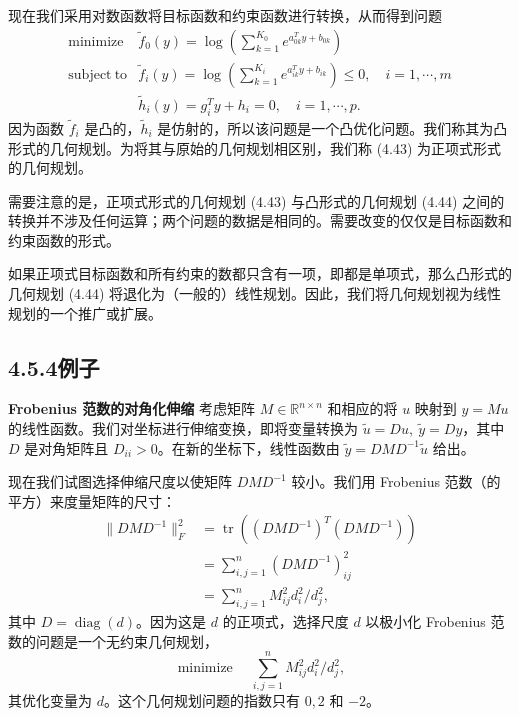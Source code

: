 \documentclass[UTF8, 12pt, fontset=fandol, oneside]{ctexart}
\begin{document}
现在我们采用对数函数将目标函数和约束函数进行转换，从而得到问题
\begin{equation}
\begin{array}{ll}
\mathop{\mathrm{minimize}} & \tilde f_0(y)=\log\left(\displaystyle\sum_{k=1}^{K_0}e^{a_{0k}^Ty+b_{0k}}\right)\\
\mathrm{subject\ to} & \tilde f_i(y)=\log\left(\displaystyle\sum_{k=1}^{K_i}e^{a_{ik}^Ty+b_{ik}}\right)\leq 0,\quad i=1,\cdots,m\\
& \tilde h_i(y)=g_i^Ty+h_i=0,\quad i=1,\cdots,p.
\end{array}
\tag{4.44}
\end{equation}
因为函数 $\tilde f_i$ 是凸的，$\tilde h_i$ 是仿射的，所以该问题是一个凸优化问题。我们称其为凸形式的几何规划。为将其与原始的几何规划相区别，我们称 (4.43) 为正项式形式的几何规划。

需要注意的是，正项式形式的几何规划 (4.43) 与凸形式的几何规划 (4.44) 之间的转换并不涉及任何运算；两个问题的数据是相同的。需要改变的仅仅是目标函数和约束函数的形式。

如果正项式目标函数和所有约束的数都只含有一项，即都是单项式，那么凸形式的几何规划 (4.44) 将退化为（一般的）线性规划。因此，我们将几何规划视为线性规划的一个推广或扩展。

\subsection*{4.5.4\quad 例子}

\noindent\textbf{Frobenius 范数的对角化伸缩}\quad
考虑矩阵 $M\in\mathbb{R}^{n\times n}$ 和相应的将 $u$ 映射到 $y=Mu$ 的线性函数。我们对坐标进行伸缩变换，即将变量转换为 $\tilde u=Du,\ \tilde y=Dy$，其中 $D$ 是对角矩阵且 $D_{ii}>0$。在新的坐标下，线性函数由 $\tilde y=DMD^{-1}\tilde u$ 给出。

现在我们试图选择伸缩尺度以使矩阵 $DMD^{-1}$ 较小。我们用 Frobenius 范数（的平方）来度量矩阵的尺寸：
\[
\begin{aligned}
\|DMD^{-1}\|_F^2
&=\operatorname{tr}\left((DMD^{-1})^T(DMD^{-1})\right)\\
&=\sum_{i,j=1}^n (DMD^{-1})_{ij}^2\\
&=\sum_{i,j=1}^n M_{ij}^2d_i^2/d_j^2,
\end{aligned}
\]
其中 $D=\operatorname{diag}(d)$。因为这是 $d$ 的正项式，选择尺度 $d$ 以极小化 Frobenius 范数的问题是一个无约束几何规划，
\[
\mathop{\mathrm{minimize}}\quad \sum_{i,j=1}^n M_{ij}^2d_i^2/d_j^2,
\]
其优化变量为 $d$。这个几何规划问题的指数只有 $0,2$ 和 $-2$。
\end{document}
